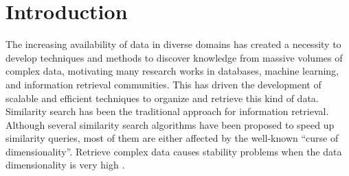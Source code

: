 \documentclass[conference]{IEEEtran}
\begin{document}
\section{Introduction}\label{sec:intro}

The increasing availability of data in diverse domains has created a necessity to develop techniques and methods to discover knowledge from massive volumes of complex data, motivating many research works in databases, machine learning, and information retrieval communities.  This has driven the development of scalable and efficient techniques to organize and retrieve this kind of data. Similarity search has been the traditional approach for information retrieval.  Although several similarity search algorithms have been proposed to speed up similarity queries, most of them are either affected by the well-known ``curse of dimensionality''.  Retrieve  complex data causes   stability problems  when the data dimensionality is very high \cite{aleman_high_dimensional}.  %


\end{document}

